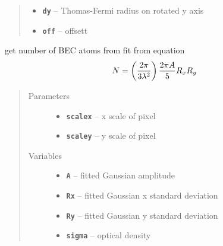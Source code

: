 \documentclass[letterpaper,10pt,english]{sphinxmanual}
\begin{document}
\begin{fulllineitems}
\begin{fulllineitems}
\begin{quote}
\begin{description}
\begin{itemize}
\item {} 
\textbf{\texttt{dy}} -- Thomas-Fermi radius on rotated y axis

\item {} 
\textbf{\texttt{off}} -- offsett

\end{itemize}

\end{description}\end{quote}

\end{fulllineitems}


\begin{fulllineitems}
\label{fit_object:Fitobject.fit_object.Therm_num}
get number of BEC atoms from fit from equation
\begin{gather}
\begin{split}N = \left(\frac{2 \pi}{3\lambda^2}\right)\frac{2\pi A}{5}R_x R_y\end{split}\notag
\end{gather}\begin{quote}\begin{description}
\item[{Parameters}] \leavevmode\begin{itemize}
\item {} 
\textbf{\texttt{scalex}} -- x scale of pixel

\item {} 
\textbf{\texttt{scaley}} -- y scale of pixel

\end{itemize}

\item[{Variables}] \leavevmode\begin{itemize}
\item {} 
\textbf{\texttt{A}} -- fitted Gaussian amplitude

\item {} 
\textbf{\texttt{Rx}} -- fitted Gaussian x standard deviation

\item {} 
\textbf{\texttt{Ry}} -- fitted Gaussian y standard deviation

\item {} 
\textbf{\texttt{sigma}} -- optical density

\end{itemize}


\end{description}
\end{quote}
\end{fulllineitems}
\end{fulllineitems}
\end{document}
